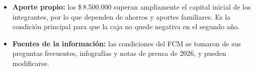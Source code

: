 \begin{itemize}
            \item \textbf{Aporte propio:} los \$\,8.500.000 superan ampliamente el capital inicial de los integrantes, por lo que dependen de ahorros y aportes familiares. Es la condición principal para que la caja no quede negativa en el segundo año.

            \item \textbf{Fuentes de la información:} las condiciones del FCM se tomaron de sus preguntas frecuentes, infografías y notas de prensa de 2026, y pueden modificarse.
        \end{itemize}
